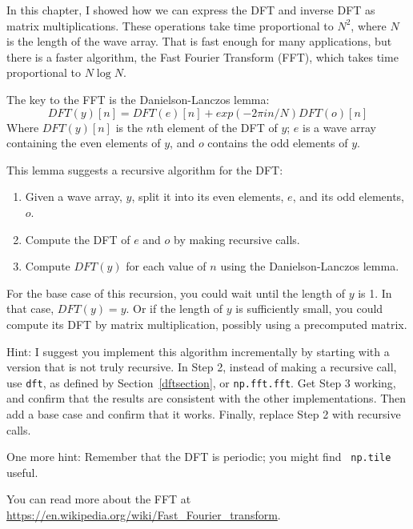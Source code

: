 \begin{exercise}
	In this chapter, I showed how we can express the DFT and inverse DFT
	as matrix multiplications.  These operations take time proportional to
	$N^2$, where $N$ is the length of the wave array.  That is fast enough
	for many applications, but there is a faster
	algorithm, the Fast Fourier Transform (FFT), which takes time
	proportional to $N \log N$.
	
	The key to the FFT is the Danielson-Lanczos lemma:
	\[ DFT(y)[n] = DFT(e)[n] + exp(-2 \pi i n / N) DFT(o)[n] \]
	Where $ DFT(y)[n]$ is the $n$th element of the DFT of $y$; $e$ is a
	wave array containing the even elements of $y$, and $o$ contains the
	odd elements of $y$.
	
	This lemma suggests a recursive algorithm for the DFT:
	
	\begin{enumerate}
		
		\item Given a wave array, $y$, split it into its even elements, $e$,
		and its odd elements, $o$.
		
		\item Compute the DFT of $e$ and $o$ by making recursive calls.
		
		\item Compute $DFT(y)$ for each value of $n$ using the
		Danielson-Lanczos lemma.
		
	\end{enumerate}
	
	For the base case of this recursion, you could wait until the length
	of $y$ is 1.  In that case, $DFT(y) = y$.  Or if the length of $y$
	is sufficiently small, you could compute its DFT by matrix multiplication,
	possibly using a precomputed matrix.
	
	Hint: I suggest you implement this algorithm incrementally by starting
	with a version that is not truly recursive.  In Step 2, instead of
	making a recursive call, use {\tt dft}, as defined by
	Section~\ref{dftsection}, or {\tt np.fft.fft}.  Get Step 3 working,
	and confirm that the results are consistent with the other
	implementations.  Then add a base case and confirm that it works.
	Finally, replace Step 2 with recursive calls.
	
	One more hint: Remember that the DFT is periodic; you might find {\tt
		np.tile} useful.
	
	You can read more about the FFT at
	\url{https://en.wikipedia.org/wiki/Fast_Fourier_transform}.
	
\end{exercise}